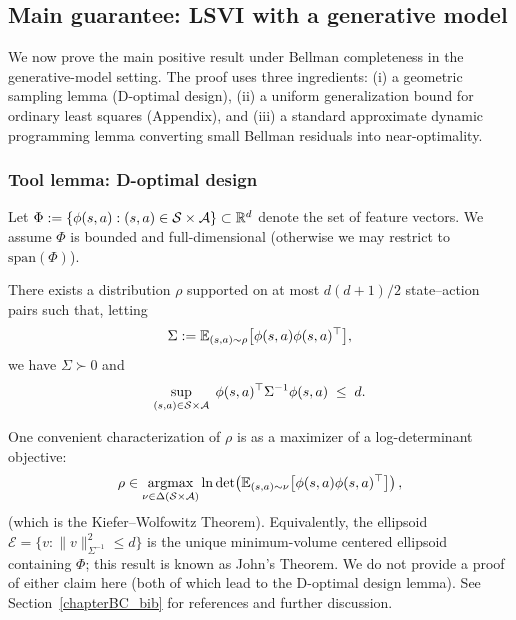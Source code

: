 \subsection{Main guarantee: LSVI with a generative model}
\label{subsec:BC_generative_main}

We now prove the main positive result under Bellman completeness in the
generative-model setting. The proof uses three ingredients:
(i) a geometric sampling lemma (D-optimal design),
(ii) a uniform generalization bound for ordinary least squares (Appendix),
and (iii) a standard approximate dynamic programming lemma converting small
Bellman residuals into near-optimality.

\subsubsection{Tool lemma: D-optimal design}
\label{subsubsec:BC_dopt}

Let $\Phi := \{\phi(s,a): (s,a)\in\mathcal{S}\times\mathcal{A}\}\subset\mathbb{R}^d$ denote the set of
feature vectors. We assume $\Phi$ is bounded and full-dimensional (otherwise we
may restrict to $\mathrm{span}(\Phi)$).

\begin{lemma}\label{lem:d_opt_design}
There exists a distribution $\rho$ supported on at most $d(d+1)/2$ state--action
pairs such that, letting
\[
\Sigma := \mathbb{E}_{(s,a)\sim\rho}\big[\phi(s,a)\phi(s,a)^\top\big],
\]
we have $\Sigma \succ 0$ and
\[
\sup_{(s,a)\in\mathcal{S}\times\mathcal{A}} \; \phi(s,a)^\top \Sigma^{-1} \phi(s,a) \;\le\; d .
\]
\end{lemma}

One convenient characterization of $\rho$ is as a maximizer of a log-determinant
objective:
\begin{align}
\rho \in \operatorname*{argmax}_{\nu \in \Delta(\mathcal{S}\times\mathcal{A})}
\ln\det\!\left(\mathbb{E}_{(s,a)\sim\nu}\big[\phi(s,a)\phi(s,a)^\top\big]\right),
\label{eq:d_design}
\end{align}
(which is the Kiefer--Wolfowitz Theorem).
Equivalently, the ellipsoid $\mathcal{E}=\{v:\|v\|_{\Sigma^{-1}}^2\le d\}$ is the
unique minimum-volume centered ellipsoid containing $\Phi$; this
result is known as John's Theorem.  We do not provide a
proof of either claim here (both of which lead to the D-optimal design
lemma).  See Section~\ref{chapterBC_bib} for references and further discussion.

